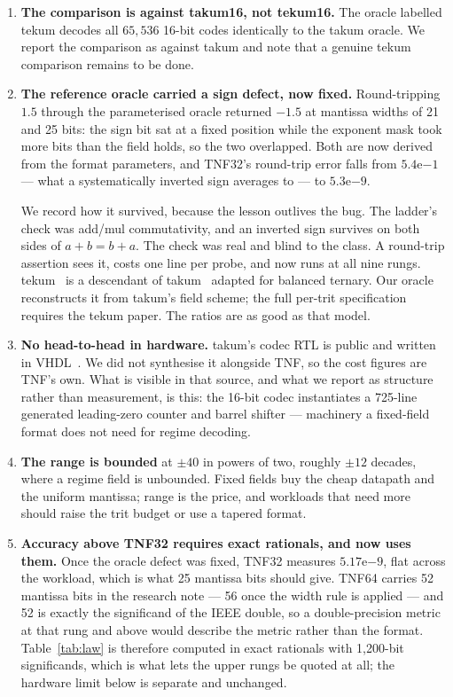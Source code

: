 \documentclass[11pt]{article}
\theoremstyle{definition}
\begin{document}
\begin{enumerate}[leftmargin=*]
\item \textbf{The comparison is against takum16, not tekum16.} The oracle
labelled tekum decodes all $65{,}536$ 16-bit codes identically to the takum
oracle. We report the comparison as against takum and note that a genuine tekum
comparison remains to be done.

\item \textbf{The reference oracle carried a sign defect, now fixed.} Round-tripping
$1.5$ through the parameterised oracle returned $-1.5$ at mantissa widths of 21
and 25 bits: the sign bit sat at a fixed position while the exponent mask took
more bits than the field holds, so the two overlapped. Both are now derived from
the format parameters, and TNF32's round-trip error falls from
$5.4\mathrm{e}{-1}$ --- what a systematically inverted sign averages to --- to
$5.3\mathrm{e}{-9}$.

We record how it survived, because the lesson outlives the bug. The ladder's
check was add/mul commutativity, and an inverted sign survives on both sides of
$a+b=b+a$. The check was real and blind to the class. A round-trip assertion sees
it, costs one line per probe, and now runs at all nine rungs. tekum~\cite{tekum} is a descendant of takum~\cite{takum} adapted for balanced
ternary. Our
oracle reconstructs it from takum's field scheme; the full per-trit
specification requires the tekum paper. The ratios are as good as that model.

\item \textbf{No head-to-head in hardware.} takum's codec RTL is public and
written in VHDL~\cite{takumrtl}. We did not synthesise it alongside TNF, so the cost figures are
TNF's own. What is visible in that source, and what we report as structure
rather than measurement, is this: the 16-bit codec instantiates a 725-line
generated leading-zero counter and barrel shifter --- machinery a fixed-field
format does not need for regime decoding.

\item \textbf{The range is bounded} at $\pm40$ in powers of two, roughly $\pm12$
decades, where a regime field is unbounded. Fixed fields buy the cheap datapath
and the uniform mantissa; range is the price, and workloads that need more should
raise the trit budget or use a tapered format.

\item \textbf{Accuracy above TNF32 requires exact rationals, and now uses them.}
Once the oracle defect was fixed, TNF32 measures $5.17\mathrm{e}{-9}$, flat
across the workload, which is what 25 mantissa bits should give. TNF64 carries
52 mantissa bits in the research note --- 56 once the width rule is applied ---
and 52 is exactly the significand of the IEEE double, so a double-precision
metric at that rung and above would describe the metric rather than the format.
Table~\ref{tab:law} is therefore computed in exact rationals with 1{,}200-bit
significands, which is what lets the upper rungs be quoted at all; the hardware
limit below is separate and unchanged.


\end{enumerate}
\end{document}
